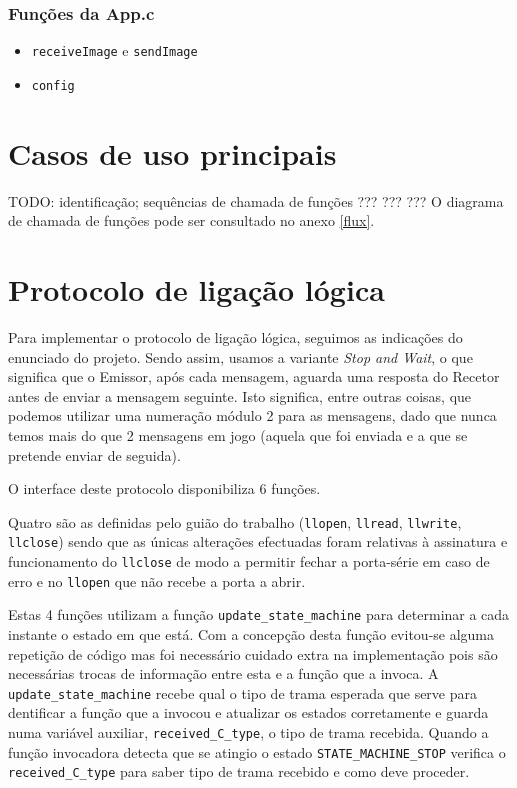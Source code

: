 \documentclass[11pt,a4paper,reqno]{report}
\numberwithin{equation}{section}
\begin{document}
\subsection{Funções da App.c}
\begin{itemize}
\item \verb|receiveImage| e \verb|sendImage|
\item \verb|config|
\end{itemize}



\chapter{Casos de uso principais}

TODO: identificação; sequências de chamada de funções
??? ??? ???
O diagrama de chamada de funções pode ser consultado no anexo \ref{flux}.

\chapter{Protocolo de ligação lógica}

Para implementar o protocolo de ligação lógica, seguimos as indicações do enunciado do projeto. Sendo assim, usamos a variante \emph{Stop and Wait}, o que significa que o Emissor, após cada mensagem, aguarda uma resposta do Recetor antes de enviar a mensagem seguinte. Isto significa, entre outras coisas, que podemos utilizar uma numeração módulo 2 para as mensagens, dado que nunca temos mais do que 2 mensagens em jogo (aquela que foi enviada e a que se pretende enviar de seguida).

O interface deste protocolo disponibiliza 6 funções. 

Quatro são as definidas pelo guião do trabalho (\verb|llopen|, \verb|llread|, \verb|llwrite|, \verb|llclose|) sendo que as únicas alterações efectuadas foram relativas à assinatura e funcionamento do \verb|llclose| de modo a permitir fechar a porta-série em caso de erro e no \verb|llopen|  que não recebe a porta a abrir. 

Estas 4 funções utilizam a função \verb|update_state_machine| para determinar a cada instante o estado em que está.
Com a concepção desta função evitou-se alguma repetição de código mas foi necessário cuidado extra na implementação pois são necessárias trocas de informação entre esta e a função que a invoca. A \verb|update_state_machine| recebe qual o tipo de trama esperada que serve para dentificar a função que a invocou e atualizar os estados corretamente e guarda numa variável auxiliar, \verb|received_C_type|, o tipo de trama recebida. Quando a função invocadora detecta que se atingio o estado \verb|STATE_MACHINE_STOP| verifica o \verb|received_C_type| para saber  tipo de trama recebido e como deve proceder.
\end{document}
